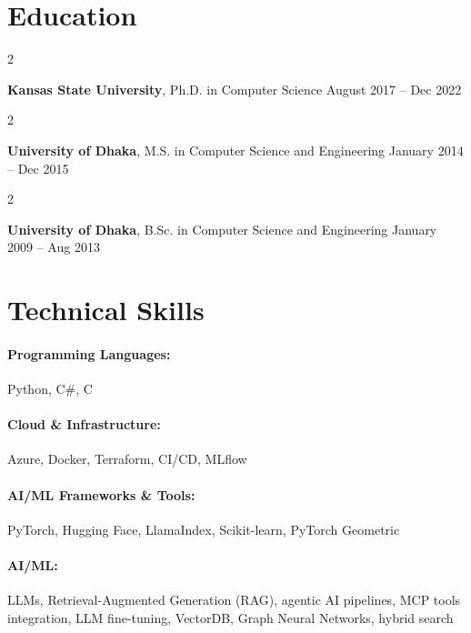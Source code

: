 \documentclass[10pt, letterpaper]{article}
\newenvironment{twocolentry}[2][]{
    \onecolentry
    \def\secondColumn{#2}
    \setcolumnwidth{\fill, 4.5 cm}
    \begin{paracol}{2}
}{
    \switchcolumn \raggedleft \secondColumn
    \end{paracol}
    \endonecolentry
} %
\begin{document}
\section{Education}

        \begin{twocolentry}{
            August 2017 -- Dec 2022
        }
            \textbf{Kansas State University}, Ph.D. in Computer Science\end{twocolentry}

        \begin{twocolentry}{
            January 2014 -- Dec 2015
        }
            \textbf{University of Dhaka}, M.S. in Computer Science and Engineering\end{twocolentry}

        \begin{twocolentry}{
            January 2009 -- Aug 2013
        }
            \textbf{University of Dhaka}, B.Sc. in Computer Science and Engineering\end{twocolentry}

\vspace{-1mm}
\section{Technical Skills}

        \paragraph{Programming Languages:} Python, C\#, C
        \vspace{-4mm}
        \paragraph{Cloud \& Infrastructure:} Azure, Docker, Terraform, CI/CD, MLflow
        \vspace{-4mm}
        \paragraph{AI/ML Frameworks \& Tools:} PyTorch, Hugging Face, LlamaIndex, Scikit-learn, PyTorch Geometric
        \vspace{-4mm}
        \paragraph{AI/ML:} LLMs, Retrieval-Augmented Generation (RAG), agentic AI pipelines, MCP tools integration, LLM fine-tuning, VectorDB, Graph Neural Networks, hybrid search
\end{document}

